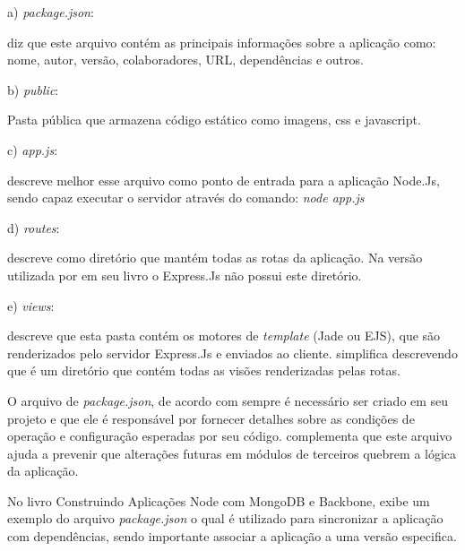     \begin{compactitem}
    \item[a)] \textit{package.json}:
    
    \cite{Pereira:2013} diz que este arquivo contém as principais informações sobre a aplicação como: 
    nome, autor, versão, colaboradores, URL, dependências e outros.
    
    \item[b)] \textit{public}:
    
    Pasta pública que armazena código estático como imagens, css e javascript. \cite{Pereira:2013}
    
    \item[c)] \textit{app.js}:
    
    \cite{Wilson:2013} descreve melhor esse arquivo como ponto de entrada para a aplicação Node.Js, 
    sendo capaz executar o servidor através do comando: \textit{node app.js}
    
    \item[d)] \textit{routes}:
    
    \cite{Pereira:2013} descreve como diretório que mantém todas as rotas da aplicação. 
    Na versão utilizada por  em seu livro o Express.Js não possui este diretório.
    
    \item[e)] \textit{views}: 
    
    \cite{Wilson:2013} descreve que esta pasta contém os motores de \textit{template} (Jade ou EJS), 
    que são renderizados pelo servidor Express.Js e enviados ao cliente. \cite{Pereira:2013}
    simplifica descrevendo que é um diretório que contém todas as visões renderizadas pelas rotas.
    
  \end{compactitem}
  
  O arquivo de \textit{package.json}, de acordo com  sempre é necessário ser criado 
  em seu projeto e que ele é responsável por fornecer detalhes sobre as condições de operação e configuração 
  esperadas por seu código. \cite{Wilson:2013} complementa que este arquivo ajuda a prevenir que alterações 
  futuras em módulos de terceiros quebrem a lógica da aplicação.

  No livro Construindo Aplicações Node com MongoDB e Backbone, \cite{Wilson:2013} exibe um exemplo do arquivo 
  \textit{package.json} o qual é utilizado para sincronizar a aplicação com dependências, sendo importante associar 
  a aplicação a uma versão especifica. 
  
